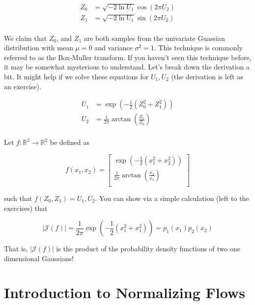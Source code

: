 \documentclass[book.tex]{subfiles}
\begin{document}
\begin{eqnarray*}
Z_0 &= \sqrt{-2 \ln U_1} \cos(2\pi U_2) \\
Z_1 &= \sqrt{- 2 \ln U_1} \sin(2 \pi U_2) \\
\end{eqnarray*}

We claim that $Z_0$, and $Z_1$ are both samples from the univariate Guassian distribution with mean $\mu = 0$ and variance $\sigma^2 = 1$. This technique is commonly referred to as the Box-Muller transform. If you haven't seen this technique before, it may be somewhat mysterious to understand. Let's break down the derivation a bit. It might help if we solve these equations for $U_1, U_2$ (the derivation is left as an exercise).

\begin{align*}
U_1 &= \exp\left(-\frac{1}{2}(Z_0^2 + Z_1^2) \right) \\
U_2 &= \frac{1}{2\pi} \arctan\left (\frac{Z_1}{Z_0}\right) \\
\end{align*}

Let $f:\mathbb{R}^2 \to \mathbb{R}^2$ be defined as

\[ f(x_1, x_2) = \begin{bmatrix}
    \exp\left(-\frac{1}{2}(x_1^2 + x_2^2) \right) \\
    \frac{1}{2\pi} \arctan\left (\frac{x_2}{x_1}\right) \\
    \end{bmatrix} \]
    
such that $f(Z_0, Z_1) = U_1, U_2$. You can show via a simple calculation (left to the exercises) that 

\[ |\mathcal{J}(f)| = \frac{1}{2\pi}\exp \left ( -\frac{1}{2} (x_1^2 + x_1^2) \right ) = p_1(x_1) p_2(x_2) \]

That is, $|\mathcal{J}(f)|$ is the product of the probability density functions of two one dimensional Gaussians!

\section{Introduction to Normalizing Flows}
\end{document}
